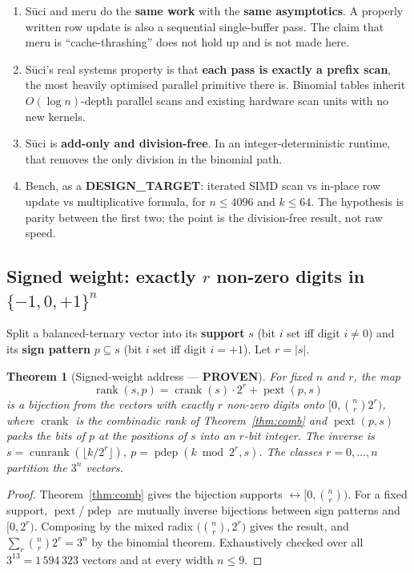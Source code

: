 \documentclass[11pt,letterpaper]{article}
\newcommand{\tagbox}[2]{\textsf{\textbf{\color{#1}#2}}}
\newcommand{\PROVEN}{\tagbox{tagproven}{PROVEN}}
\newcommand{\DESIGN}{\tagbox{tagdesign}{DESIGN\_TARGET}}
\DeclareMathOperator{\pext}{pext}
\DeclareMathOperator{\pdep}{pdep}
\DeclareMathOperator{\crank}{crank}
\DeclareMathOperator{\cunrank}{cunrank}
\theoremstyle{plain}
\newtheorem{theorem}{Theorem}
\theoremstyle{remark}
\begin{document}
\begin{enumerate}[label=\arabic*.]
\item Sūci and meru do the \textbf{same work} with the \textbf{same asymptotics}. A properly written row update is also a sequential single-buffer pass. The claim that meru is ``cache-thrashing'' does not hold up and is not made here.
\item Sūci's real systems property is that \textbf{each pass is exactly a prefix scan}, the most heavily optimised parallel primitive there is. Binomial tables inherit $O(\log n)$-depth parallel scans and existing hardware scan units with no new kernels.
\item Sūci is \textbf{add-only and division-free}. In an integer-deterministic runtime, that removes the only division in the binomial path.
\item Bench, as a \DESIGN: iterated SIMD scan vs in-place row update vs multiplicative formula, for $n \le 4096$ and $k \le 64$. The hypothesis is parity between the first two; the point is the division-free result, not raw speed.
\end{enumerate}

\subsection{Signed weight: exactly $r$ non-zero digits in $\{-1,0,+1\}^n$}\label{sec:signed}

Split a balanced-ternary vector into its \textbf{support} $s$ (bit $i$ set iff digit $i \ne 0$) and its \textbf{sign pattern} $p \subseteq s$ (bit $i$ set iff digit $i = +1$). Let $r = |s|$.

\begin{theorem}[Signed-weight address \textup{---} \PROVEN]\label{thm:signed}
For fixed $n$ and $r$, the map
\[
\operatorname{rank}(s,p) = \crank(s)\cdot 2^r + \pext(p,s)
\]
is a bijection from the vectors with exactly $r$ non-zero digits onto $\bigl[0, \binom{n}{r} 2^r\bigr)$, where $\crank$ is the combinadic rank of Theorem~\ref{thm:comb} and $\pext(p,s)$ packs the bits of $p$ at the positions of $s$ into an $r$-bit integer. The inverse is $s = \cunrank(\lfloor k/2^r \rfloor)$, $p = \pdep(k \bmod 2^r, s)$. The classes $r = 0,\dots,n$ partition the $3^n$ vectors.
\end{theorem}
\begin{proof}
Theorem~\ref{thm:comb} gives the bijection supports $\leftrightarrow \bigl[0,\binom{n}{r}\bigr)$. For a fixed support, $\pext$/$\pdep$ are mutually inverse bijections between sign patterns and $[0, 2^r)$. Composing by the mixed radix $\bigl(\binom{n}{r}, 2^r\bigr)$ gives the result, and $\sum_r \binom{n}{r} 2^r = 3^n$ by the binomial theorem. Exhaustively checked over all $3^{13} = 1\,594\,323$ vectors and at every width $n \le 9$.
\end{proof}
\end{document}
